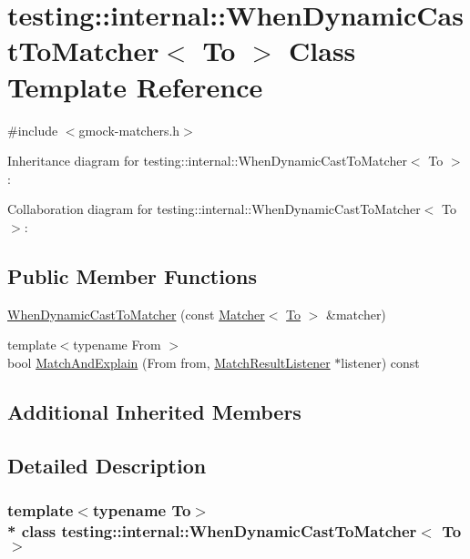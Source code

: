 \hypertarget{classtesting_1_1internal_1_1_when_dynamic_cast_to_matcher}{}\section{testing\+:\+:internal\+:\+:When\+Dynamic\+Cast\+To\+Matcher$<$ To $>$ Class Template Reference}
\label{classtesting_1_1internal_1_1_when_dynamic_cast_to_matcher}


{\ttfamily \#include $<$gmock-\/matchers.\+h$>$}



Inheritance diagram for testing\+:\+:internal\+:\+:When\+Dynamic\+Cast\+To\+Matcher$<$ To $>$\+:


Collaboration diagram for testing\+:\+:internal\+:\+:When\+Dynamic\+Cast\+To\+Matcher$<$ To $>$\+:
\subsection*{Public Member Functions}
\begin{DoxyCompactItemize}
\item 
\hyperlink{classtesting_1_1internal_1_1_when_dynamic_cast_to_matcher_a44e444d218197f8180c5ac7fca135f9a}{When\+Dynamic\+Cast\+To\+Matcher} (const \hyperlink{classtesting_1_1_matcher}{Matcher}$<$ \hyperlink{classtesting_1_1internal_1_1_to}{To} $>$ \&matcher)
\item 
{\footnotesize template$<$typename From $>$ }\\bool \hyperlink{classtesting_1_1internal_1_1_when_dynamic_cast_to_matcher_afea5e5230fa9955bfdf9902587c44676}{Match\+And\+Explain} (From from, \hyperlink{classtesting_1_1_match_result_listener}{Match\+Result\+Listener} $\ast$listener) const 
\end{DoxyCompactItemize}
\subsection*{Additional Inherited Members}


\subsection{Detailed Description}
\subsubsection*{template$<$typename To$>$\\*
class testing\+::internal\+::\+When\+Dynamic\+Cast\+To\+Matcher$<$ To $>$}



